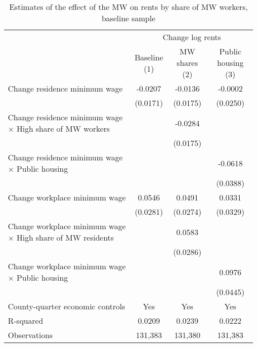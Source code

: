 \begin{table}[hbt!] \centering
    \caption{Estimates of the effect of the MW on rents by share of MW workers, baseline sample}
    \label{tab:heterogeneity}
    \begin{tabular}{@{}lccc@{}}
        \toprule
            & \multicolumn{3}{c}{Change log rents}                                                  \\ \cmidrule(l){2-4} 
            & \shortstack{Baseline\\(1)} 
            & \shortstack{MW shares\\(2)}                                             
            & \shortstack{Public housing\\(3)}                                                      \\ \midrule
        Change residence minimum wage                                     &  -0.0207   &  -0.0136  &  -0.0002   \\
                                                                          & (0.0171)  & (0.0175) & (0.0250)  \\
        Change residence minimum wage $\times$ High share of MW workers   &        &  -0.0284  &        \\
                                                                          &        & (0.0175) &        \\
        Change residence minimum wage $\times$ Public housing             &        &       &  -0.0618   \\
                                                                          &        &       & (0.0388)  \\
        Change workplace minimum wage                                     &  0.0546   &  0.0491  &  0.0331   \\
                                                                          & (0.0281)  & (0.0274) & (0.0329)  \\
        Change workplace minimum wage $\times$ High share of MW residents &        &  0.0583  &        \\
                                                                          &        & (0.0286) &        \\
        Change workplace minimum wage $\times$ Public housing             &        &       &  0.0976   \\
                                                                          &        &       & (0.0445)  \\
        County-quarter economic controls                                  &  Yes   &  Yes  &   Yes  \\
        R-squared                                                         &  0.0209   &  0.0239  &   0.0222  \\
        Observations                                                      &  131,383  &  131,380 &   131,383 \\ \bottomrule
    \end{tabular}


\end{table}
